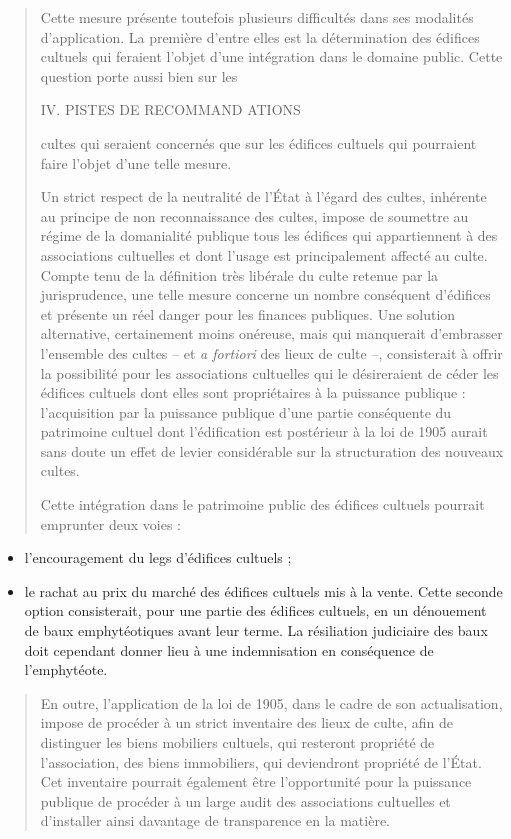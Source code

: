 \begin{quote}
Cette mesure présente toutefois plusieurs difficultés dans ses modalités
d'application. La première d'entre elles est la détermination des
édifices cultuels qui feraient l'objet d'une intégration dans le domaine
public. Cette question porte aussi bien sur les

IV. PISTES DE RECOMMAND ATIONS

cultes qui seraient concernés que sur les édifices cultuels qui
pourraient faire l'objet d'une telle mesure.

Un strict respect de la neutralité de l'État à l'égard des cultes,
inhérente au principe de non reconnaissance des cultes, impose de
soumettre au régime de la domanialité publique tous les édifices qui
appartiennent à des associations cultuelles et dont l'usage est
principalement affecté au culte. Compte tenu de la définition très
libérale du culte retenue par la jurisprudence, une telle mesure
concerne un nombre conséquent d'édifices et présente un réel danger pour
les finances publiques. Une solution alternative, certainement moins
onéreuse, mais qui manquerait d'embrasser l'ensemble des cultes -- et
\emph{a fortiori} des lieux de culte --, consisterait à offrir la
possibilité pour les associations cultuelles qui le désireraient de
céder les édifices cultuels dont elles sont propriétaires à la puissance
publique : l'acquisition par la puissance publique d'une partie
conséquente du patrimoine cultuel dont l'édification est postérieur à la
loi de 1905 aurait sans doute un effet de levier considérable sur la
structuration des nouveaux cultes.

Cette intégration dans le patrimoine public des édifices cultuels
pourrait emprunter deux voies :
\end{quote}

\begin{itemize}
\item
  l'encouragement du legs d'édifices cultuels ;
\item
  le rachat au prix du marché des édifices cultuels mis à la vente.
  Cette seconde option consisterait, pour une partie des édifices
  cultuels, en un dénouement de baux emphytéotiques avant leur terme. La
  résiliation judiciaire des baux doit cependant donner lieu à une
  indemnisation en conséquence de l'emphytéote.
\end{itemize}

\begin{quote}
En outre, l'application de la loi de 1905, dans le cadre de son
actualisation, impose de procéder à un strict inventaire des lieux de
culte, afin de distinguer les biens mobiliers cultuels, qui resteront
propriété de l'association, des biens immobiliers, qui deviendront
propriété de l'État. Cet inventaire pourrait également être
l'opportunité pour la puissance publique de procéder à un large audit
des associations cultuelles et d'installer ainsi davantage de
transparence en la matière.
\end{quote}

